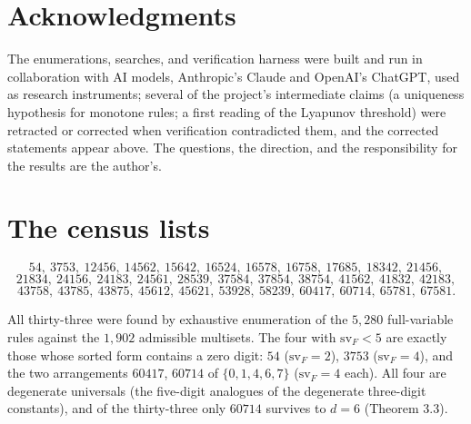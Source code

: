 \documentclass[11pt,letterpaper]{article}
\theoremstyle{paperstyle}
\theoremstyle{paperstyledef}
\theoremstyle{paperstylerem}
\begin{document}
\section*{Acknowledgments}\label{acknowledgments}

The enumerations, searches, and verification harness were built and run in collaboration with AI models, Anthropic's Claude and OpenAI's ChatGPT, used as research instruments; several of the project's intermediate claims (a uniqueness hypothesis for monotone rules; a first reading of the Lyapunov threshold) were retracted or corrected when verification contradicted them, and the corrected statements appear above. The questions, the direction, and the responsibility for the results are the author's.

\appendix

\section{The census lists}\label{the-census-lists}

\[54,\ 3753,\ 12456,\ 14562,\ 15642,\ 16524,\ 16578,\ 16758,\ 17685,\ 18342,\ 21456,\] \[21834,\ 24156,\ 24183,\ 24561,\ 28539,\ 37584,\ 37854,\ 38754,\ 41562,\ 41832,\ 42183,\] \[43758,\ 43785,\ 43875,\ 45612,\ 45621,\ 53928,\ 58239,\ 60417,\ 60714,\ 65781,\ 67581.\]

All thirty-three were found by exhaustive enumeration of the \(5{,}280\) full-variable rules against the \(1{,}902\) admissible multisets. The four with \(\mathrm{sv}_F < 5\) are exactly those whose sorted form contains a zero digit: \(54\) (\(\mathrm{sv}_F = 2\)), \(3753\) (\(\mathrm{sv}_F = 4\)), and the two arrangements \(60417\), \(60714\) of \(\{0,1,4,6,7\}\) (\(\mathrm{sv}_F = 4\) each). All four are degenerate universals (the five-digit analogues of the degenerate three-digit constants), and of the thirty-three only \(60714\) survives to \(d = 6\) (Theorem 3.3).
\end{document}
